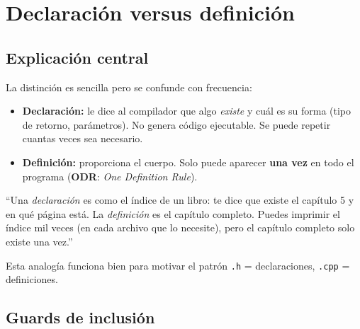\documentclass[12pt, oneside]{article}
\begin{document}
\section{Declaración versus definición}

\subsection{Explicación central}

La distinción es sencilla pero se confunde con frecuencia:

\begin{itemize}
  \item \textbf{Declaración:} le dice al compilador que algo \textit{existe}
        y cuál es su forma (tipo de retorno, parámetros).  No genera código
        ejecutable.  Se puede repetir cuantas veces sea necesario.
  \item \textbf{Definición:} proporciona el cuerpo.  Solo puede aparecer
        \textbf{una vez} en todo el programa (\textbf{ODR}: \textit{One Definition Rule}).
\end{itemize}

\begin{notaprofesor}
  ``Una \textit{declaración} es como el índice de un libro: te dice que
  existe el capítulo 5 y en qué página está.  La \textit{definición} es
  el capítulo completo.  Puedes imprimir el índice mil veces (en cada
  archivo que lo necesite), pero el capítulo completo solo existe una vez.''
  \par\smallskip
  Esta analogía funciona bien para motivar el patrón
  \texttt{.h} = declaraciones, \texttt{.cpp} = definiciones.
\end{notaprofesor}

\subsection{Guards de inclusión}
\end{document}
